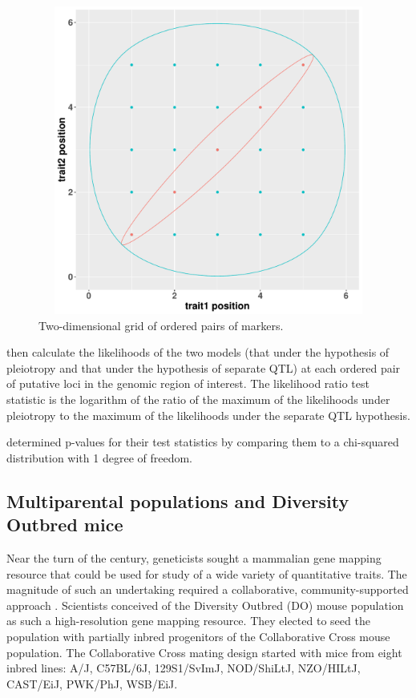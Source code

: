 \documentclass[]{article}\usepackage[]{graphicx}\usepackage[]{color}
\newenvironment{knitrout}{}{} %
\begin{document}
\begin{knitrout}
\color{fgcolor}\begin{figure}
\includegraphics[width=6in,height=4in]{figure/encircle-1} \caption[Two-dimensional grid of ordered pairs of markers]{Two-dimensional grid of ordered pairs of markers.}\label{fig:encircle}
\end{figure}


\end{knitrout}



\citet{jiang1995multiple} then calculate the likelihoods of the two models
(that under the hypothesis of pleiotropy and that under the hypothesis of separate QTL)
at each ordered pair of putative loci in the genomic region of interest.
The likelihood ratio test statistic is the logarithm of the ratio of the maximum
of the likelihoods under pleiotropy to the maximum of the likelihoods under
the separate QTL hypothesis. 

\citet{jiang1995multiple} determined p-values for their test statistics by comparing
them to a chi-squared distribution with 1 degree of freedom. 





\subsection{Multiparental populations and Diversity Outbred mice}

Near the turn of the century, geneticists sought a mammalian gene mapping resource 
that could be used for study of a wide variety of quantitative traits. 
The magnitude of such an undertaking required a collaborative, community-supported
approach \citep{de2014genetics}. Scientists conceived of the Diversity Outbred (DO)
mouse population as such a high-resolution gene mapping resource.
They elected to seed the population with partially inbred progenitors of the
Collaborative Cross mouse population. The Collaborative Cross mating design started with
mice from eight inbred lines: A/J, C57BL/6J, 129S1/SvImJ,
NOD/ShiLtJ, NZO/HILtJ, CAST/EiJ, PWK/PhJ, WSB/EiJ.
\end{document}

